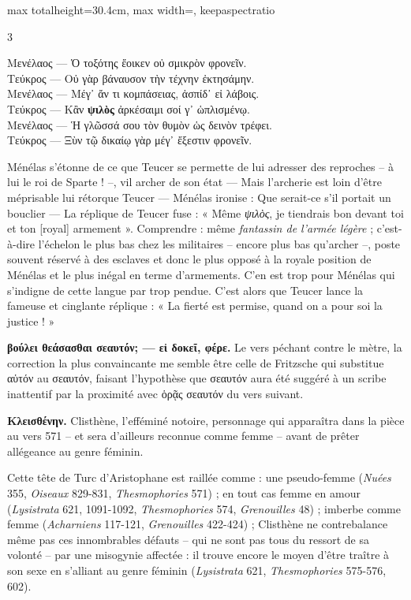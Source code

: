 \documentclass[11pt,twoside]{book}
\newcommand{\italique}[1]{\textit{#1}}
\newcommand{\citComm}[1]{\begin{quoting}[vskip=0.4pt,leftmargin=0.7em,rightmargin=0.2em]#1\end{quoting}}
\begin{document}
\begin{adjustbox}{max totalheight=30.4cm, max width=\textwidth, keepaspectratio}
\begin{minipage}{\textwidth}
{\begin{multicols}{3}
\citComm{Μενέλαος — Ὁ τοξότης ἔοικεν οὐ σμικρὸν φρονεῖν.\\	
Τεύκρος — Οὐ γὰρ βάναυσον τὴν τέχνην ἐκτησάμην.\\
Μενέλαος — Μέγ᾽ ἄν τι κομπάσειας, ἀσπίδ᾽ εἰ λάβοις.\\
Τεύκρος — Κἂν \textbf{ψιλὸς} ἀρκέσαιμι σοί γ᾽ ὡπλισμένῳ.\\
Μενέλαος — Ἡ γλῶσσά σου τὸν θυμὸν ὡς δεινὸν τρέφει.\\
Τεύκρος — Ξὺν τῷ δικαίῳ γὰρ μέγ᾽ ἔξεστιν φρονεῖν.}
\par\vspace{1.5pt}
\noindent Ménélas s'étonne de ce que Teucer se permette de lui adresser des reproches – à lui le roi de Sparte ! –, vil archer de son état --- Mais l'archerie est loin d'être méprisable lui rétorque Teucer --- Ménélas ironise : Que serait-ce s'il portait un bouclier --- La réplique de Teucer fuse : « Même \italique{ψιλὸς}, je tiendrais bon devant toi et ton [royal] armement ». Comprendre : même \italique{fantassin de l'armée légère} ; c'est-à-dire l'échelon le plus bas chez les militaires – encore plus bas qu'archer –, poste souvent réservé à des esclaves et donc le plus opposé à la royale position de Ménélas et le plus inégal en terme d'armements. C'en est trop pour Ménélas qui s'indigne de cette langue par trop pendue. C'est alors que Teucer lance la fameuse et cinglante réplique : « La fierté est permise, quand on a pour soi la justice ! »
\par\vspace{1.5pt}
 \textbf{βούλει θεάσασθαι σεαυτόν; — εἰ δοκεῖ, φέρε.} Le vers péchant contre le mètre, la correction la plus convaincante me semble être celle de Fritzsche qui substitue αὑτόν au σεαυτόν, faisant l'hypothèse que σεαυτόν aura été suggéré à un scribe inattentif par la proximité avec ὁρᾷς σεαυτόν du vers suivant.
\par\vspace{1.5pt}
 \textbf{Κλεισθένην.} Clisthène, l'efféminé notoire, personnage qui apparaîtra dans la pièce au vers 571 -- et sera d'ailleurs reconnue comme femme -- avant de prêter allégeance au genre féminin.
\par\vspace{1.5pt}
\noindent Cette tête de Turc d'Aristophane est raillée comme : une pseudo-femme (\italique{Nuées} 355, \italique{Oiseaux} 829-831, \italique{Thesmophories} 571) ; en tout cas femme en amour (\italique{Lysistrata} 621, 1091-1092, \italique{Thesmophories} 574, \italique{Grenouilles} 48) ; imberbe comme femme (\italique{Acharniens} 117-121, \italique{Grenouilles} 422-424) ; Clisthène ne contrebalance même pas ces innombrables défauts – qui ne sont pas tous du ressort de sa volonté – par une misogynie affectée : il trouve encore le moyen d'être traître à son sexe en s'alliant au genre féminin (\italique{Lysistrata} 621, \italique{Thesmophories} 575-576, 602).

\end{multicols}}
\end{minipage}
\end{adjustbox}
\end{document}

